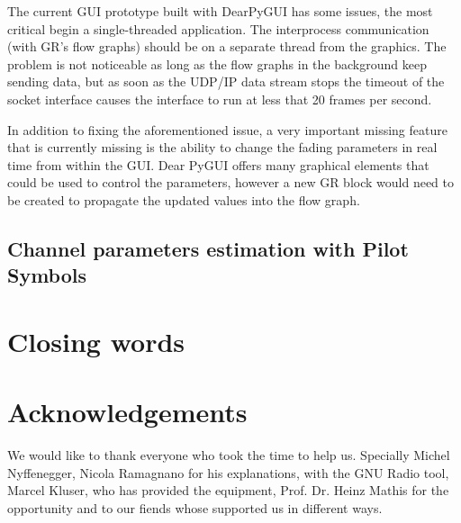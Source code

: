 The current GUI prototype built with DearPyGUI has some issues, the most critical begin a single-threaded application. The interprocess communication (with GR's flow graphs) should be on a separate thread from the graphics. The problem is not noticeable as long as the flow graphs in the background keep sending data, but as soon as the UDP/IP data stream stops the timeout of the socket interface causes the interface to run at less that 20 frames per second.

In addition to fixing the aforementioned issue, a very important missing feature that is currently missing is the ability to change the fading parameters in real time from within the GUI. Dear PyGUI offers many graphical elements that could be used to control the parameters, however a new GR block would need to be created to propagate the updated values into the flow graph.

\subsection{Channel parameters estimation with Pilot Symbols}



\section{Closing words}

\section{Acknowledgements}


We would like to thank everyone who took the time to help us. Specially Michel Nyffenegger, Nicola Ramagnano for his explanations, with the GNU Radio tool,
Marcel Kluser, who has provided the equipment, Prof. Dr. Heinz Mathis for the opportunity and to our fiends whose supported us in different ways.



